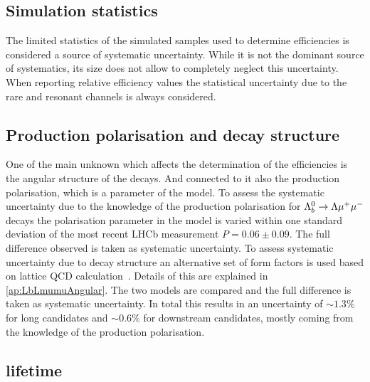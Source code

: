 \subsection{Simulation statistics}

The limited statistics of the simulated samples used to determine efficiencies is considered a source of systematic uncertainty.
While it is not the dominant source of systematics, its size does not allow to completely neglect this uncertainty.
When reporting relative efficiency values the statistical uncertainty due to the  rare and resonant channels
is always considered. 

\subsection{Production polarisation and decay structure}
\label{sec:BRpolsys}

One of the main unknown which affects the determination of the efficiencies is the angular structure of
the decays. And connected to it also the production polarisation, which is a parameter of the model.
%
To assess the systematic uncertainty due to the knowledge of the production polarisation for $\Lambda^0_b\rightarrow\Lambda\mu^+\mu^-$ decays
the polarisation parameter in the model is varied within one standard deviation of the
most recent LHCb measurement $P = 0.06 \pm 0.09$\cite{Aaij:2013oxa}. The full difference observed is
taken as systematic uncertainty. To assess systematic uncertainty due to decay structure
an alternative set of form factors is used based on lattice QCD calculation~\cite{Detmold:2012vy}.
Details of this are explained in \ref{ap:LbLmumuAngular}. The two models are compared and the full difference
is taken as systematic uncertainty.
%
In total this results in an uncertainty of $\sim 1.3\%$ for long candidates and $\sim 0.6\%$ for downstream
candidates, mostly coming from the knowledge of the production polarisation.

\subsection{\Lb lifetime}

